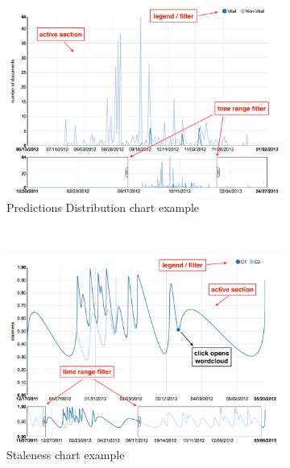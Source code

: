\documentclass{article}
\begin{document}
\begin{figure}[tb]
        \centering
        \begin{subfigure}[b]{0.4\textwidth}
			\includegraphics[width=\textwidth]{fig/vitalDistribution.png}
			\caption{Predictions Distribution chart example}
			\label{vitalEvol}
        \end{subfigure}
        \\
        \begin{subfigure}[b]{0.4\textwidth}
            \includegraphics[width=\textwidth]{fig/stalenessDistribution.png}
			\caption{Staleness chart example}
			\label{stalenessEvol}
        \end{subfigure}
        \\
        \begin{subfigure}[b]{0.25\textwidth}

\end{subfigure}
\end{figure}
\end{document}
